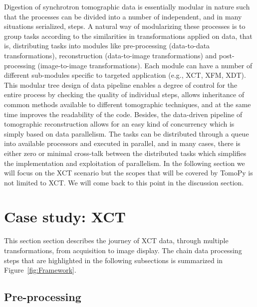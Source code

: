 \documentclass[pdf]{iucr}              %
\begin{document}

Digestion of synchrotron tomographic data is essentially modular in nature such that the processes can be divided into a number of independent, and in many situations serialized, steps. A natural way of modularizing these processes is to group tasks according to the similarities in transformations applied on data, that is, distributing tasks into modules like pre-processing (data-to-data transformations), reconstruction (data-to-image transformations) and post-processing (image-to-image transformations). Each module can have a number of different sub-modules specific to targeted application (e.g., XCT, XFM, XDT). This  modular tree design of data pipeline enables a degree of control for the entire process by checking the quality of individual steps, allows inheritance of common methods available to different tomographic techniques, and at the same time improves the readability of the code. Besides, the data-driven pipeline of tomographic reconstruction allows for an easy kind of concurrency which is simply based on data parallelism. The tasks can be distributed through a queue into available processors and executed in parallel, and in many cases, there is either zero or minimal cross-talk between the distributed tasks which simplifies the implementation and exploitation of parallelism. In the following section we will focus on the XCT scenario but the scopes that will be covered by TomoPy is not limited to XCT. We will come back to this point in the discussion section.

\section{Case study: XCT} 

This section section describes the journey of XCT data, through multiple transformations, from acquisition to image display. The chain data processing steps that are highlighted in the following subsections is summarized in Figure~\ref{fig:Framework}. 

\subsection{Pre-processing} 
\end{document}
